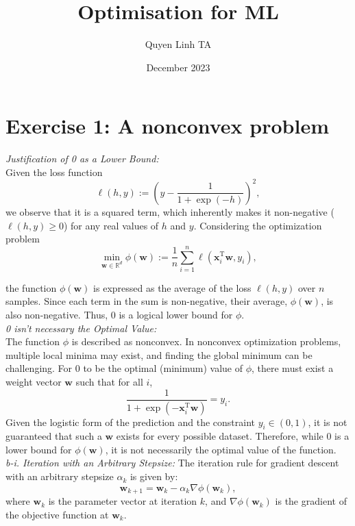 \documentclass[12pt]{article}
\title{Optimisation for ML}
\author{Quyen Linh TA}
\date{December 2023}
\begin{document}
    \maketitle

    \section*{Exercise 1: A nonconvex problem}

    \textit{Justification of 0 as a Lower Bound:}\\
    Given the loss function
    \begin{equation}
        \ell(h, y) := \left(y - \frac{1}{1+\exp(-h)}\right)^2,
    \end{equation}
    we observe that it is a squared term, which inherently makes it non-negative (\(\ell(h, y) \geq 0\)) for any real values of \(h\) and \(y\). Considering the optimization problem
    \begin{equation}
        \min_{\boldsymbol{w} \in \mathbb{R}^d} \phi(\boldsymbol{w}) := \frac{1}{n} \sum_{i=1}^{n} \ell\left(\boldsymbol{x}_{i}^{\mathrm{T}} \boldsymbol{w}, y_{i}\right),
    \end{equation}

    the function \(\phi(\boldsymbol{w})\) is expressed as the average of the loss \(\ell(h, y)\) over \(n\) samples. Since each term in the sum is non-negative, their average, \(\phi(\boldsymbol{w})\), is also non-negative. Thus, 0 is a logical lower bound for \(\phi\).\\

    \textit{0 isn't necessary the Optimal Value:}\\
    The function \(\phi\) is described as nonconvex. In nonconvex optimization problems, multiple local minima may exist, and finding the global minimum can be challenging. For 0 to be the optimal (minimum) value of \(\phi\), there must exist a weight vector \(\boldsymbol{w}\) such that for all \(i\),
    \[
        \frac{1}{1+\exp \left(-\boldsymbol{x}_{i}^{\mathrm{T}} \boldsymbol{w}\right)} = y_{i}.
    \]
    Given the logistic form of the prediction and the constraint \(y_i \in (0,1)\), it is not guaranteed that such a \(\boldsymbol{w}\) exists for every possible dataset. Therefore, while 0 is a lower bound for \(\phi(\boldsymbol{w})\), it is not necessarily the optimal value of the function.\\

    \textit{b-i. Iteration with an Arbitrary Stepsize:}
    The iteration rule for gradient descent with an arbitrary stepsize \(\alpha_k\) is given by:
    \[
        \boldsymbol{w}_{k+1} = \boldsymbol{w}_k - \alpha_k \nabla \phi(\boldsymbol{w}_k),
    \]
    where \(\boldsymbol{w}_k\) is the parameter vector at iteration \(k\), and \(\nabla \phi(\boldsymbol{w}_k)\) is the gradient of the objective function at \(\boldsymbol{w}_k\).
\end{document}
